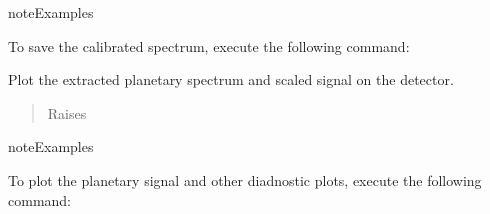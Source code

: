 \documentclass[a4paper,10pt,english]{sphinxmanual}
\begin{document}
\begin{fulllineitems}
\begin{fulllineitems}
\begin{quote}
\begin{description}
\end{description}\end{quote}

\begin{sphinxadmonition}{note}{Examples}

To save the calibrated spectrum, execute the following command:

%
\begin{sphinxVerbatim}[commandchars=\\\{\}]
\end{sphinxVerbatim}
\end{sphinxadmonition}

\end{fulllineitems}


\begin{fulllineitems}
\label{\detokenize{cascade.TSO:cascade.TSO.TSO.TSOSuite.plot_results}}
Plot the extracted planetary spectrum and scaled signal on the
detector.
\begin{quote}\begin{description}
\item[{Raises}] \leavevmode
{}

\end{description}\end{quote}

\begin{sphinxadmonition}{note}{Examples}

To plot the planetary signal and other diadnostic plots, execute
the following command:

%
\begin{sphinxVerbatim}[commandchars=\\\{\}]
\end{sphinxVerbatim}
\end{sphinxadmonition}

\end{fulllineitems}


\end{fulllineitems}
\end{document}
